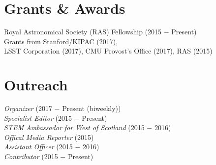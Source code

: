 \documentclass[]{deedy-resume-openfont}
\begin{document}
\begin{minipage}[t]{0.33\textwidth}

\section{\color{Blue} Grants \& Awards} 
\textbullet{} Royal Astronomical Society (RAS) Fellowship (2015 $-$ Present) \\
\textbullet{} Grants from Stanford/KIPAC (2017), \\ LSST Corporation (2017), CMU Provost's Office (2017), RAS (2015)\\
\sectionsep


\section{\color{Blue} Outreach}
 \textit{Organizer} (2017 $-$ Present (biweekly)) \\
 \textit{Specialist Editor} (2015 $-$ Present) \\
 \textit{STEM Ambassador for West of Scotland} (2015 $-$ 2016) \\
 \textit{Offical Media Reporter} (2015) \\
 \textit{Assistant Officer} (2015 $-$ 2016) \\
 \textit{Contributor} (2015 $-$ Present) \\
\sectionsep



%
%

\end{minipage} 
\end{document}

